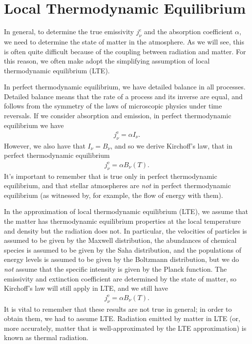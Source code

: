 \section{Local Thermodynamic Equilibrium}

In general, to determine the true emissivity $j_\nu^{e}$ and the
absorption coefficient $\alpha$, we need to determine the state of
matter in the atmosphere. As we will see, this is often quite difficult
because of the coupling between radiation and matter. For this reason,
we often make adopt the simplifying assumption of local thermodynamic
equilibrium (LTE).

In perfect thermodynamic equilibrium, we have detailed balance in all
processes. Detailed balance means that the rate of a process and its
inverse are equal, and follows from the symmetry of the laws of
microscopic physics under time reversals. If we consider absorption and
emission, in perfect thermodynamic equilibrium  we have
\begin{align}
j_\nu^\mathrm{e} = \alpha I_\nu.
\end{align}
However, we also have that $I_\nu = B_\nu$, and so we derive Kirchoff's
law, that in perfect thermodynamic equilibrium
\begin{align}
j_\nu^\mathrm{e} = \alpha B_\nu(T).
\end{align}
It's important to remember that is true only in perfect thermodynamic
equilibrium, and that stellar atmospheres are \emph{not} in perfect
thermodynamic equilibrium (as witnessed by, for example, the flow of
energy with them).

In the approximation of local thermodynamic equilibrium (LTE), we assume
that the matter has thermodynamic equilibrium properties at the local
temperature and density but the radiation does not. In particular, the
velocities of particles is assumed to be given by the Maxwell
distribution, the abundances of chemical species is assumed to be given
by the Saha distribution, and the populations of energy levels is
assumed to be given by the Boltzmann distribution, but we do \emph{not}
assume that the specific intensity is given by the Planck function. The
emissivity and extinction coefficient are determined by the state of
matter, so Kirchoff's law will still apply in LTE, and we still have
\begin{align}
j_\nu^\mathrm{e} = \alpha B_\nu(T).
\end{align}
It is vital to remember that these results are not true in general; in
order to obtain them, we had to assume LTE. Radiation emitted by matter
in LTE (or, more accurately, matter that is well-approximated by the LTE
approximation) is known as thermal radiation.

